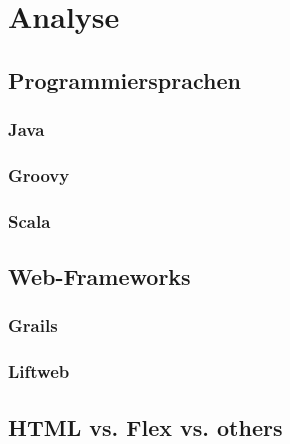\chapter{Analyse}
\section{Programmiersprachen}
\subsection{Java}

\subsection{Groovy}

\subsection{Scala}


\section{Web-Frameworks}
\subsection{Grails}

\subsection{Liftweb}


\section{HTML vs. Flex vs. others}

